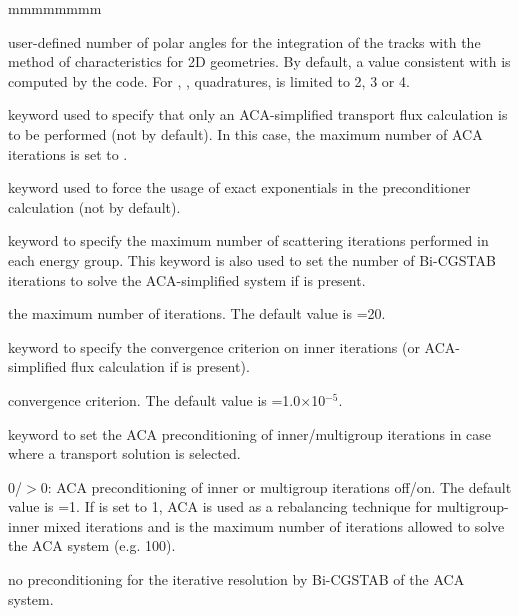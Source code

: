 \begin{ListeDeDescription}{mmmmmmmm}
\item[\dusa{nmu}] user-defined number of polar angles for the integration of the tracks with the method of characteristics for 2D geometries. By default, a value consistent with  is computed by the code. For , ,  quadratures,  is limited to 2, 3 or 4.

\item[\moc{DIFC}] keyword used to specify that only an ACA-simplified transport flux calculation is to be performed (not by default). In this case, the maximum
number of ACA iterations is set to .

\item[\moc{LEXA}] keyword used to force the usage of exact exponentials in the preconditioner calculation (not by default).

\item[\moc{MAXI}] keyword to specify the maximum number of scattering iterations performed in each energy group. This keyword is also used to set the number of Bi-CGSTAB iterations to solve the ACA-simplified system if  is present.

\item[\dusa{nmaxi}] the maximum number of iterations. The default value is =20.

\item[\moc{EPSI}] keyword to specify the convergence criterion on inner
iterations (or ACA-simplified flux calculation if  is present).

\item[\dusa{xepsi}] convergence criterion. The default value is =1.0$\times$10$^{-5}$.

\item[\moc{AAC}] keyword to set the ACA preconditioning of inner/multigroup
iterations in case where a transport solution is selected.\cite{cdd,suslov2}

\item[\dusa{iaca}] $0$/$>0$: ACA preconditioning of inner or multigroup iterations off/on. The default value is =1. If  is set to 1, ACA is used as a rebalancing technique for multigroup-inner mixed iterations and  is the maximum number of iterations allowed to solve the ACA system (e.g. 100).

\item[\moc{NONE}] no preconditioning for the iterative resolution by Bi-CGSTAB of the ACA system.


\end{ListeDeDescription}
